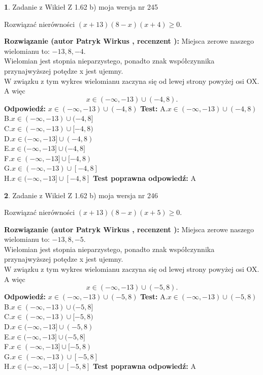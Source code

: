 \documentclass[12pt, a4paper]{article}
\theoremstyle{definition} %
\newtheorem{zad}{}
\newcommand{\zadStart}[1]{\begin{zad}#1\newline}
\newcommand{\zadStop}{\end{zad}}
\newcommand{\rozwStart}[2]{\noindent \textbf{Rozwiązanie (autor #1 , recenzent #2): }\newline}
\newcommand{\rozwStop}{\newline}
\newcommand{\odpStart}{\noindent \textbf{Odpowiedź:}\newline}
\newcommand{\odpStop}{\newline}
\newcommand{\testStart}{\noindent \textbf{Test:}\newline}
\newcommand{\testStop}{\newline}
\newcommand{\kluczStart}{\noindent \textbf{Test poprawna odpowiedź:}\newline}
\newcommand{\kluczStop}{\newline}
\begin{document}
\zadStart{Zadanie z Wikieł Z 1.62 b) moja wersja nr 245}

Rozwiązać nierówności $(x+13)(8-x)(x+4)\ge0$.
\zadStop
\rozwStart{Patryk Wirkus}{}
Miejsca zerowe naszego wielomianu to: $-13, 8, -4$.\\
Wielomian jest stopnia nieparzystego, ponadto znak współczynnika przy\linebreak najwyższej potędze x jest ujemny.\\ W związku z tym wykres wielomianu zaczyna się od lewej strony powyżej osi OX. A więc $$x \in (-\infty,-13) \cup (-4,8).$$
\rozwStop
\odpStart
$x \in (-\infty,-13) \cup (-4,8)$
\odpStop
\testStart
A.$x \in (-\infty,-13) \cup (-4,8)$\\
B.$x \in (-\infty,-13) \cup (-4,8]$\\
C.$x \in (-\infty,-13) \cup [-4,8)$\\
D.$x \in (-\infty,-13] \cup (-4,8)$\\
E.$x \in (-\infty,-13] \cup (-4,8]$\\
F.$x \in (-\infty,-13] \cup [-4,8)$\\
G.$x \in (-\infty,-13) \cup [-4,8]$\\
H.$x \in (-\infty,-13] \cup [-4,8]$
\testStop
\kluczStart
A
\kluczStop



\zadStart{Zadanie z Wikieł Z 1.62 b) moja wersja nr 246}

Rozwiązać nierówności $(x+13)(8-x)(x+5)\ge0$.
\zadStop
\rozwStart{Patryk Wirkus}{}
Miejsca zerowe naszego wielomianu to: $-13, 8, -5$.\\
Wielomian jest stopnia nieparzystego, ponadto znak współczynnika przy\linebreak najwyższej potędze x jest ujemny.\\ W związku z tym wykres wielomianu zaczyna się od lewej strony powyżej osi OX. A więc $$x \in (-\infty,-13) \cup (-5,8).$$
\rozwStop
\odpStart
$x \in (-\infty,-13) \cup (-5,8)$
\odpStop
\testStart
A.$x \in (-\infty,-13) \cup (-5,8)$\\
B.$x \in (-\infty,-13) \cup (-5,8]$\\
C.$x \in (-\infty,-13) \cup [-5,8)$\\
D.$x \in (-\infty,-13] \cup (-5,8)$\\
E.$x \in (-\infty,-13] \cup (-5,8]$\\
F.$x \in (-\infty,-13] \cup [-5,8)$\\
G.$x \in (-\infty,-13) \cup [-5,8]$\\
H.$x \in (-\infty,-13] \cup [-5,8]$
\testStop
\kluczStart
A
\kluczStop
\end{document}
